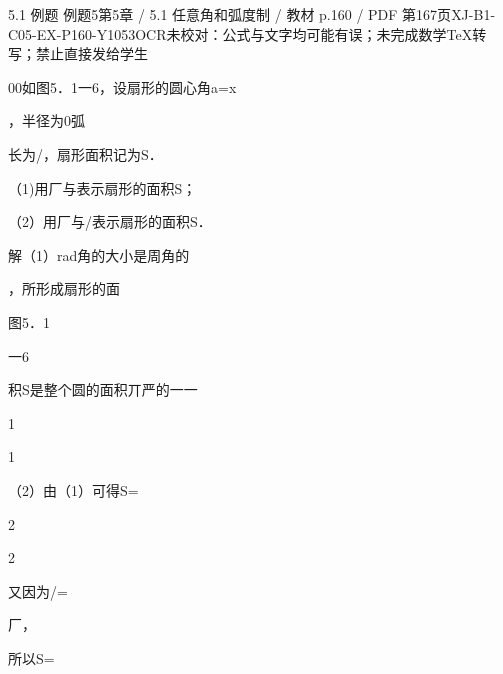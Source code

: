 \begin{bankitem}{5.1 例题 例题5}{第5章 / 5.1 任意角和弧度制 / 教材 p.160 / PDF 第167页}{XJ-B1-C05-EX-P160-Y1053}{OCR未校对：公式与文字均可能有误；未完成数学TeX转写；禁止直接发给学生}
\begin{ocrdraft}
\par
00如图5．1一6，设扇形的圆心角a=x
\par
，半径为0弧
\par
长为/，扇形面积记为S．
\par
（1)用厂与表示扇形的面积S；
\par
（2）用厂与/表示扇形的面积S．
\par
解（1）rad角的大小是周角的
\par
，所形成扇形的面
\par
图5．1
\par
一6
\par
积S是整个圆的面积丌严的一一
\par
1
\par
1
\par
（2）由（1）可得S=
\par
2
\par
2
\par
又因为/=
\par
厂，
\par
所以S=
\end{ocrdraft}
\end{bankitem}
